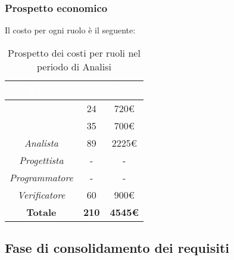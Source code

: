 \subsubsection{Prospetto economico}
Il costo per ogni ruolo è il seguente:
\begin{table}[H]
	\begin{center}
		\begin{tabular}{ |c c c| }
		\rowcolor{darkblue} 
		\textcolor{white}{\textbf{Ruolo}} & \textcolor{white}{\textbf{Ore}} & \textcolor{white}{\textbf{Costo}} \\ \hline
		\textit{\Responsabile} 	& 24 	& 720€ \\ \hline
		\textit{\Amministratore} 	& 35 	& 700€ \\ \hline
		\textit{Analista} 		& 89 	& 2225€ \\ \hline
		\textit{Progettista} 	& - 	& - \\ \hline
		\textit{Programmatore}  	& - 	& - \\ \hline
		\textit{Verificatore} 	& 60 	& 900€ \\ \hline
		\textbf{Totale} 		& \textbf{210} & \textbf{4545€} \\ \hline
		\end{tabular}
	\caption{ Prospetto dei costi per ruoli nel periodo di Analisi}
	\end{center}
\end{table}

\subsection{Fase di consolidamento dei requisiti}

